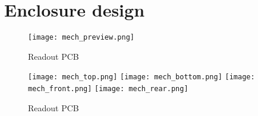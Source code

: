 \chapter{Enclosure design}


\FloatBarrier
\begin{figure}[htp!]
    \centering
    \texttt{[image: mech\_preview.png]}
    \caption{Readout PCB}
    \label{fig:readout_3d}
\end{figure}
\FloatBarrier

\FloatBarrier
\begin{figure}[htp!]
    \centering
    \texttt{[image: mech\_top.png]}
    \texttt{[image: mech\_bottom.png]}
    \texttt{[image: mech\_front.png]}
    \texttt{[image: mech\_rear.png]}
    \caption{Readout PCB}
    \label{fig:readout_3d}
\end{figure}
\FloatBarrier
